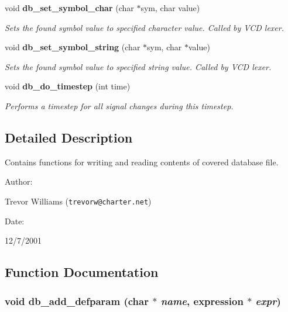 \begin{CompactItemize}
void {\bf db\_\-set\_\-symbol\_\-char} (char $\ast$sym, char value)
\begin{CompactList}\small\item\em Sets the found symbol value to specified character value. Called by VCD lexer.\item\end{CompactList}\item 
void {\bf db\_\-set\_\-symbol\_\-string} (char $\ast$sym, char $\ast$value)
\begin{CompactList}\small\item\em Sets the found symbol value to specified string value. Called by VCD lexer.\item\end{CompactList}\item 
void {\bf db\_\-do\_\-timestep} (int time)
\begin{CompactList}\small\item\em Performs a timestep for all signal changes during this timestep.\item\end{CompactList}\end{CompactItemize}


\subsection{Detailed Description}
Contains functions for writing and reading contents of covered database file.



\begin{Desc}
\item[Author: ]\par
Trevor Williams ({\tt trevorw@charter.net}) \end{Desc}
\begin{Desc}
\item[Date: ]\par
12/7/2001\end{Desc}


\subsection{Function Documentation}
\subsubsection{\setlength{\rightskip}{0pt plus 5cm}void db\_\-add\_\-defparam (char $\ast$ {\em name}, {\bf expression} $\ast$ {\em expr})}\label{db_8h_a6}


